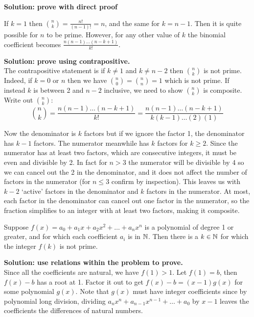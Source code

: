 \documentclass{article}
\begin{document}
\textbf{Solution: prove with direct proof}

If $k = 1$ then $\binom{n}{k} = \frac{n!}{(n-1)!} = n$, and the same for $k = n - 1$. Then it is quite possible for $n$ to be prime. However, for any other value of $k$ the binomial coefficient becomes $\frac{n(n-1)\ldots(n-k+1)}{k!}$.

\textbf{Solution: prove using contrapositive.}
\\

The contrapositive statement is if $k \neq 1$ and $k \neq n - 2$ then $\binom{n}{k}$ is not prime. Indeed, if $k = 0$ or $n$ then we have $\binom{n}{0} = \binom{n}{n} = 1$ which is not prime. If instead $k$ is between 2 and $n - 2$ inclusive, we need to show $\binom{n}{k}$ is composite. Write out $\binom{n}{k}$:
$$\binom{n}{k} = \frac{n(n-1)\ldots(n-k+1)}{k!} = \frac{n(n-1)\ldots(n-k+1)}{k(k-1)\ldots(2)(1)}$$

Now the denominator is $k$ factors but if we ignore the factor 1, the denominator has $k -1$ factors. The numerator meanwhile has $k$ factors for $k \geq 2$. Since the numerator has at least two factors, which are consecutive integers, it must be even and divisible by 2. In fact for $n > 3$ the numerator will be divisible by 4 so we can cancel out the 2 in the denominator, and it does not affect the number of factors in the numerator (for $n \leq 3$ confirm by inspection). This leaves us with $k - 2$ `active' factors in the denominator and $k$ factors in the numerator. At most, each factor in the denominator can cancel out one factor in the numerator, so the fraction simplifies to an integer with at least two factors, making it composite.

\begin{problem}
Suppose $f(x) = a_0 + a_1x + a_2 x^2 + \ldots + a_n x^n$ is a polynomial of degree 1 or greater, and for which each coefficient $a_i$ is in $\mathbb{N}$. Then there is a $k \in \mathbb{N}$ for which the integer $f(k)$ is not prime.
\end{problem}
\textbf{Solution: use relations within the problem to prove.}
\\

Since all the coefficients are natural, we have $f(1) > 1$. Let $f(1) = b$, then $f(x) - b$ has a root at 1. Factor it out to get $f(x) - b = (x - 1)g(x)$ for some polynomial $g(x)$. Note that $g(x)$ must have integer coefficients since by polynomial long division, dividing $a_n x^n + a_{n-1}x^{n-1} + \ldots + a_0$ by $x - 1$ leaves the coefficients the differences of natural numbers.
\\
\end{document}

